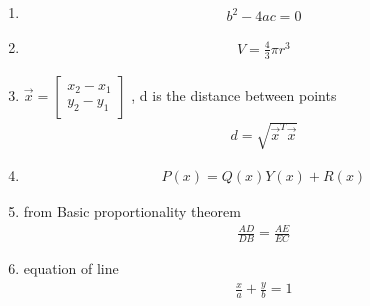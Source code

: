 \begin{enumerate}[label=\thesubsection.\arabic*, ref=\thesubsection.\theenumi]
	\item 
	\begin{align}
		b^2 -4ac =0 \label{eq:EE26BTECH11222-prob 1}
	\end{align}
	
	\item 
	\begin{align}
		V=\frac{4}{3}\pi r^3 \label{eq:EE26BTECH11222-prob 3}
	\end{align}
	
	\item
	 $\vec{x} =\begin{bmatrix}
	 	x_2 - x_1 \\
	 	y_2 - y_1
	 	\end{bmatrix}$ , d is the distance between points
	\begin{align} 
		d=\sqrt{\vec{x}^T\vec{x}}\label{eq:EE26BTECH11222-prob 4}
	\end{align}
	
	\item 
	\begin{align}
		P(x)=Q(x)Y(x)+R(x) \label{eq:ee26btech11222-prob 6}
	\end{align}
	
	\item from Basic proportionality theorem
	\begin{align}
		\frac{AD}{DB}=\frac{AE}{EC} \label{eq:ee26btech11222-prob_10 7}
	\end{align}
	
	\item equation of line 
	\begin{align}
		\frac{x}{a} +\frac{y}{b}=1
	\end{align}
	
\end{enumerate}
